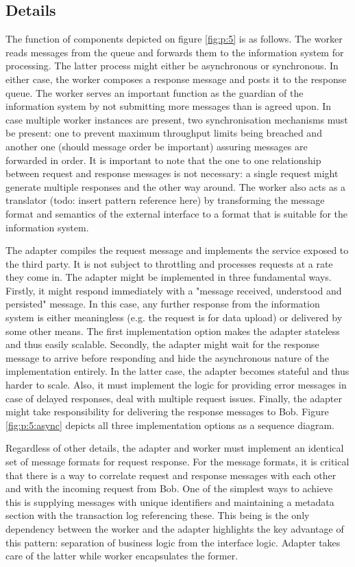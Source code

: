 \documentclass[10pt,a4paper]{article}
\begin{document}
\subsection{Details}
The function of components depicted on figure \ref{fig:p:5} is as follows.
The worker reads messages from the queue and forwards them to the information system for processing. The latter process might either be asynchronous or synchronous. In either case, the worker composes a response message and posts it to the response queue. The worker serves an important function as the guardian of the information system by not submitting more messages than is agreed upon. In case multiple worker instances are present, two synchronisation mechanisms must be present: one to prevent maximum throughput limits being breached and another one (should message order be important) assuring messages are forwarded in order. It is important to note that the one to one relationship between request and response messages is not necessary: a single request might generate multiple responses and the other way around. The worker also acts as a translator (todo: insert pattern reference here) by transforming the message format and semantics of the external interface to a format that is suitable for the information system. 

The adapter compiles the request message and implements the service exposed to the third party. It is not subject to throttling and processes requests at a rate they come in. The adapter might be implemented in three fundamental ways. Firstly, it might respond immediately with a "message received, understood and persisted" message. In this case, any further response from the information system is either meaningless (e.g. the request is for data upload) or delivered by some other means. The first implementation option makes the adapter  stateless and thus easily scalable. Secondly, the adapter might wait for the response message to arrive before responding and hide the asynchronous nature of the implementation entirely. In the latter case, the adapter becomes stateful and thus harder to scale. Also, it must implement the logic for providing error messages in case of delayed responses, deal with multiple request issues. Finally, the adapter might take responsibility for delivering the response messages to Bob. Figure \ref{fig:p:5:async} depicts all three implementation options as a sequence diagram.

Regardless of other details, the adapter and worker must implement an identical set of message formats for request response. For the message formats, it is critical that there is a way to correlate request and response messages with each other and with the incoming request from Bob. One of the simplest ways to achieve this is supplying messages with unique identifiers and maintaining a metadata section with the transaction log referencing these. This being is the only dependency between the worker and the adapter highlights the key advantage of this pattern: separation of business logic from the interface logic. Adapter takes care of the latter while worker encapsulates the former.
\end{document}
